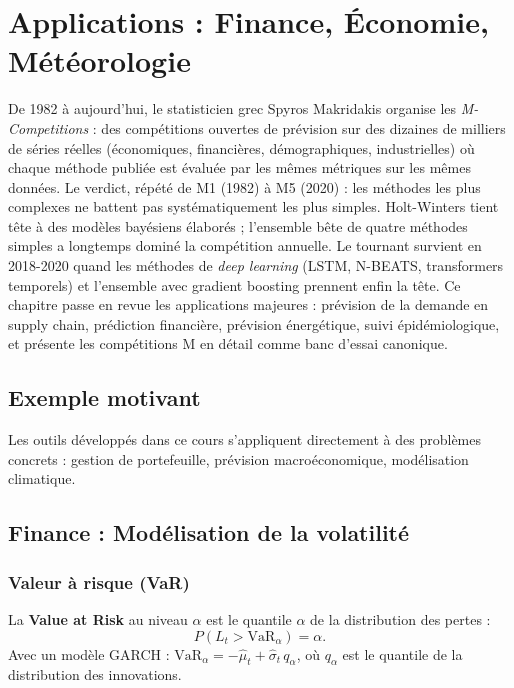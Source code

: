 \chapter{Applications : Finance, \'Economie, M\'et\'eorologie}
\label{ch:applications}

De 1982 à aujourd'hui, le statisticien grec Spyros Makridakis organise les \emph{M-Competitions} : des compétitions ouvertes de prévision sur des dizaines de milliers de séries réelles (économiques, financières, démographiques, industrielles) où chaque méthode publiée est évaluée par les mêmes métriques sur les mêmes données. Le verdict, répété de M1 (1982) à M5 (2020) : les méthodes les plus complexes ne battent pas systématiquement les plus simples. Holt-Winters tient tête à des modèles bayésiens élaborés ; l'ensemble bête de quatre méthodes simples a longtemps dominé la compétition annuelle. Le tournant survient en 2018-2020 quand les méthodes de \emph{deep learning} (LSTM, N-BEATS, transformers temporels) et l'ensemble avec gradient boosting prennent enfin la tête. Ce chapitre passe en revue les applications majeures : prévision de la demande en supply chain, prédiction financière, prévision énergétique, suivi épidémiologique, et présente les compétitions M en détail comme banc d'essai canonique.

\section{Exemple motivant}
Les outils d\'evelopp\'es dans ce cours s'appliquent directement \`a des probl\`emes concrets : gestion de portefeuille, pr\'evision macro\'economique, mod\'elisation climatique.

\section{Finance : Mod\'elisation de la volatilit\'e}

\subsection{Valeur \`a risque (VaR)}

\begin{definition}[VaR]
La \textbf{Value at Risk} au niveau $\alpha$ est le quantile $\alpha$ de la distribution des pertes :
\[
P(L_t > \text{VaR}_\alpha) = \alpha.
\]
Avec un mod\`ele GARCH : $\text{VaR}_\alpha = -\hat\mu_t + \hat\sigma_t\,q_\alpha$, o\`u $q_\alpha$ est le quantile de la distribution des innovations.
\end{definition}


